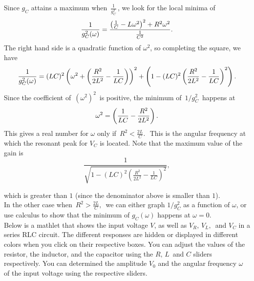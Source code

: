 Since $g _C$ attains a maximum when $\, \displaystyle \frac{1}{g_ C^2}\,$,
we look for the local minima of
\begin{equation*}
  \displaystyle  \displaystyle \frac{1}{g_ C^2(\omega )}
  \displaystyle =
  \displaystyle \frac{\left(\frac{1}{C}-L\omega ^2\right)^2+R^2\omega ^2}{\frac{1}{C^2}}.
\end{equation*}
The right hand side is a quadratic function of $\omega ^2$, so completing the square, we have
\begin{equation*}
  \displaystyle  \displaystyle \frac{1}{g_ C^2(\omega )}
  \displaystyle =
  \displaystyle (LC)^2
  \left( \omega ^2+\left(\frac{R^2}{2L^2}- \frac{1}{LC}\right)\right)^2
  + \left(1- (LC)^2\left( \frac{R^2}{2L^2}- \frac{1}{LC}\right)^2\right).
\end{equation*}
Since the coefficient of $\, \left(\omega ^2\right)^2\,$
is positive, the minimum of $\, 1/g_ C^2\,$ happens at
\begin{equation*}
  \displaystyle \displaystyle \omega ^2
  \displaystyle =
  \displaystyle  \left(\frac{1}{LC}-\frac{R^2}{2L^2}\right).
\end{equation*}
This gives a real number for $\omega$ only if $\, \displaystyle R^2<\frac{2L}{C}.\, \,$
This is the angular frequency at which the resonant peak for $V _C$ is located.
Note that the maximum value of the gain is
\begin{equation*}
  \frac{1}{\sqrt {1- (LC)^2\left( \frac{R^2}{2L^2}- \frac{1}{LC}\right)^2}},
\end{equation*}

which is greater than $1$ (since the denominator above is smaller than $1$).\\
In the other case when $\, \displaystyle R^2>\frac{2L}{C},\,$
we can either graph $1/g_ C^2$ as a function of $\omega$,
or use calculus to show that the minimum of $g _C (\omega)$ happens at $\omega=0$. \\

Below is a mathlet that shows the input voltage $V$, as well as $V _R,\, V_L,\,$
and $V_C$ in a series RLC circuit.
The different responses are hidden or displayed in different colors when you click on their respective boxes. You can adjust the values of the resistor, the inductor, and the capacitor
using the $R,\,L\,$ and $C$ sliders respectively. You can determined the amplitude $V _0$ and the angular frequency $\omega$ of the input voltage using the respective sliders. \\

